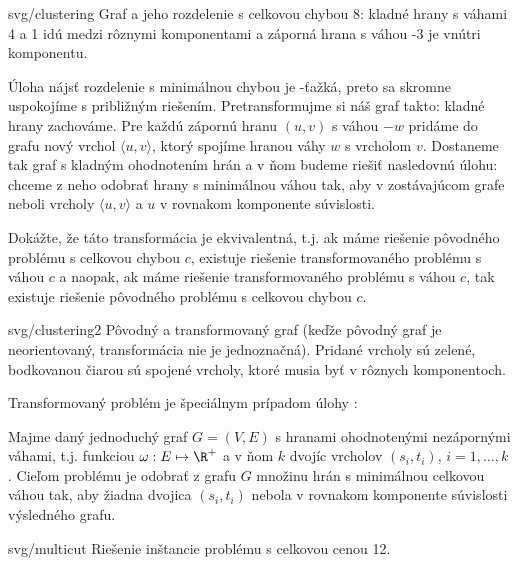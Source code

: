 \begin{myfig}{0.3\textwidth}{svg/clustering}
  Graf a jeho rozdelenie  s celkovou chybou 8: kladné hrany s váhami 4 a 1 idú medzi rôznymi komponentami a 
  záporná hrana s váhou -3 je vnútri komponentu.
\end{myfig}

\noindent
Úloha nájsť rozdelenie s minimálnou chybou je \NP-ťažká, preto sa skromne uspokojíme s približným riešením.
Pretransformujme si náš graf takto: kladné hrany zachováme. Pre každú zápornú hranu $(u,v)$ s váhou $-w$
pridáme do grafu nový vrchol $\langle u,v\rangle$, ktorý spojíme hranou váhy $w$ s vrcholom $v$.
Dostaneme tak graf s kladným ohodnotením hrán a v ňom budeme riešiť nasledovnú úlohu: chceme z neho odobrať
hrany s minimálnou váhou tak, aby v zostávajúcom grafe neboli vrcholy $\langle u,v\rangle$ a $u$ v rovnakom 
komponente súvislosti.

\begin{prob}
  Dokážte, že táto transformácia je ekvivalentná, t.j. ak máme riešenie pôvodného problému s celkovou chybou $c$,
  existuje riešenie transformovaného problému s váhou  $c$ a naopak, ak máme riešenie transformovaného
  problému s váhou $c$, tak existuje riešenie pôvodného problému s celkovou chybou $c$.
\end{prob}

\begin{myfig}{0.7\textwidth}{svg/clustering2}
  Pôvodný a transformovaný graf (keďže pôvodný graf je neorientovaný, transformácia nie je jednoznačná).
  Pridané vrcholy sú zelené, bodkovanou čiarou sú spojené vrcholy, ktoré musia byť v rôznych komponentoch.
\end{myfig}

\noindent
Transformovaný problém je špeciálnym prípadom úlohy \minmulticut:

\begin{framed}
  \begin{dfn}
    \label{dfn:multicut}
    Majme daný jednoduchý graf $G=(V,E)$ s hranami ohodnotenými nezápornými váhami, t.j. funkciou 
$\omega:E\mapsto \R^+$ a v ňom $k$ dvojíc vrcholov $(s_i,t_i)$, $i=1,\ldots,k$. Cieľom problému
\minmulticut je odobrať z grafu $G$ množinu hrán s minimálnou celkovou váhou tak, aby 
žiadna dvojica $(s_i,t_i)$ nebola v rovnakom komponente súvislosti výsledného grafu.
  \end{dfn}
\end{framed}

\begin{myfig}{0.55\textwidth}{svg/multicut}
Riešenie inštancie problému \minmulticut s celkovou cenou 12.
\end{myfig}


